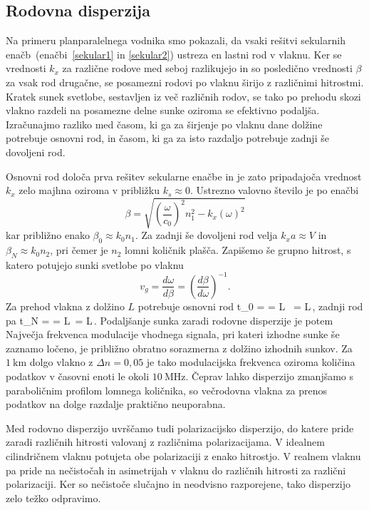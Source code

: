 \subsection*{Rodovna disperzija}
Na primeru planparalelnega vodnika smo pokazali, da vsaki rešitvi sekularnih 
enačb~(enačbi~\ref{sekular1} in \ref{sekular2}) ustreza en lastni rod v vlaknu.
Ker se vrednosti $k_x$ za različne rodove med seboj razlikujejo in so posledično vrednosti $\beta$ za 
vsak rod drugačne, se posamezni rodovi po vlaknu širijo z različnimi hitrostmi. Kratek
sunek svetlobe, sestavljen iz več različnih rodov, se tako po prehodu skozi vlakno
razdeli na posamezne delne sunke oziroma se efektivno podaljša. 
Izračunajmo razliko med časom, ki ga za širjenje po vlaknu dane dolžine 
potrebuje osnovni rod, in časom, ki ga za isto razdaljo potrebuje zadnji še dovoljeni rod.
 
Osnovni rod določa prva rešitev sekularne enačbe in je zato pripadajoča 
vrednost $k_x$ zelo majhna oziroma v približku $k_s \approx 0$. Ustrezno valovno 
število je po enačbi
\begin{equation}
\beta = \sqrt{\left( \frac{\omega}{c_0}\right)^2n_1^2 - k_x(\omega)^2}
\label{nelinfib}
\end{equation}
kar približno enako $\beta_0 \approx k_0 n_1$. 
Za zadnji še dovoljeni rod velja $k_xa \approx V$ in $\beta_N \approx k_0 n_2$, pri čemer je
$n_2$ lomni količnik plašča. Zapišemo še grupno hitrost, s katero potujejo sunki 
svetlobe po vlaknu
\begin{equation}
v_{g}=\frac{d\omega}{d\beta}=\left(\frac{d\beta}{d\omega}\right)^{-1}.
\label{9.51}
\end{equation}
Za prehod vlakna z dolžino $L$ potrebuje osnovni rod
\beq
t_0 =  =  L \, = L\,,
\eeq
zadnji rod pa 
\beq
t_N =  = L\,  = L\,.
\eeq
Podaljšanje sunka zaradi rodovne disperzije je potem 
Največja frekvenca modulacije vhodnega signala, pri kateri izhodne sunke še zaznamo ločeno,
je približno obratno sorazmerna z dolžino izhodnih sunkov. Za $1~\si{\kilo\meter}$ dolgo vlakno z 
$\Delta n = 0,05$  je tako modulacijska frekvenca oziroma količina podatkov v časovni
enoti le 
okoli $10~\si{\mega\hertz}$. Čeprav lahko disperzijo zmanjšamo 
s paraboličnim profilom lomnega količnika, so večrodovna vlakna za prenos podatkov na dolge 
razdalje praktično neuporabna.
\begin{remark}
 Med rodovno disperzijo uvrščamo tudi polarizacijsko disperzijo, 
 do katere pride zaradi različnih hitrosti valovanj z različnima polarizacijama. 
 V idealnem cilindričnem vlaknu potujeta obe polarizaciji
 z enako hitrostjo. V realnem vlaknu pa 
 pride na nečistočah in asimetrijah v vlaknu do različnih hitrosti za različni polarizaciji. 
 Ker so nečistoče slučajno in neodvisno razporejene, tako disperzijo zelo težko odpravimo.
\end{remark}

